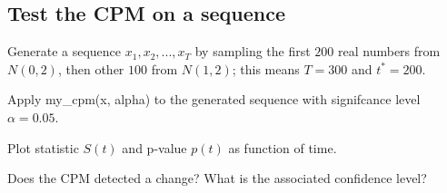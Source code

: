 \documentclass[11pt]{article}
\begin{document}
    \hypertarget{test-the-cpm-on-a-sequence}{%
\subsection{Test the CPM on a
sequence}\label{test-the-cpm-on-a-sequence}}

Generate a sequence \(x_1, x_2, ..., x_T\) by sampling the first \(200\)
real numbers from \(N(0,2)\), then other \(100\) from \(N(1,2)\); this
means \(T=300\) and \(t^*=200\).

Apply my\_cpm(x, alpha) to the generated sequence with signifcance level
\(\alpha=0.05\).

Plot statistic \(S(t)\) and p-value \(p(t)\) as function of time.

Does the CPM detected a change? What is the associated confidence level?
\end{document}
